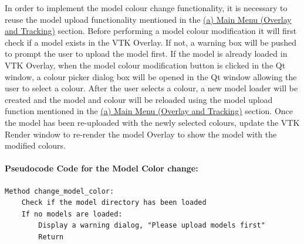 \documentclass[12pt]{article}
\begin{document}
\begin{enumerate}
\begin{enumerate}
                        In order to implement the model colour change functionality, it is necessary to reuse the model upload functionality mentioned in the \hyperref[sec:upload]{(a) Main Menu (Overlay and Tracking)} section. Before performing a model colour modification it will first check if a model exists in the VTK Overlay. If not, a warning box will be pushed to prompt the user to upload the model first. If the model is already loaded in VTK Overlay, when the model colour modification button is clicked in the Qt window, a colour picker dialog box will be opened in the Qt window allowing the user to select a colour. After the user selects a colour, a new model loader will be created and the model and colour will be reloaded using the model upload function mentioned in the \hyperref[sec:upload]{(a) Main Menu (Overlay and Tracking)} section. Once the model has been re-uploaded with the newly selected colours, update the VTK Render window to re-render the model Overlay to show the model with the modified colours.
                        \paragraph{Pseudocode Code for the Model Color change:}
                        \begin{verbatim}
Method change_model_color:
    Check if the model directory has been loaded
    If no models are loaded:
        Display a warning dialog, "Please upload models first"
        Return


\end{verbatim}
\end{enumerate}
\end{enumerate}
\end{document}
